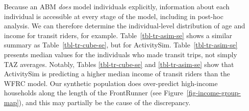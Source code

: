 \documentclass[fancy, twoside, mastersfancy, ms]{byuthesis}
\begin{document}
Because an ABM \emph{does} model individuals explicitly, information
about each individual is accessible at every stage of the model,
including in post-hoc analysis. We can therefore determine the
individual-level distribution of age and income for transit riders, for
example. Table~\ref{tbl-tr-asim-se} shows a similar summary as
Table~\ref{tbl-tr-cube-se}, but for ActivitySim.
Table~\ref{tbl-tr-asim-se} presents median values for the individuals
who made transit trips, not simply TAZ averages. Notably, Tables
\ref{tbl-tr-cube-se} and \ref{tbl-tr-asim-se} show that ActivitySim is
predicting a higher median income of transit riders than the WFRC model.
Our synthetic population does over-predict high-income households along
the length of the FrontRunner (see Figure~\ref{fig-income-group-map}),
and this may partially be the cause of the discrepancy.

\begin{table}

\caption{\label{tbl-tr-asim-se}Example Socioeconomic Analysis of Transit
Trips (ActivitySim)}


\end{table}%
\end{document}
